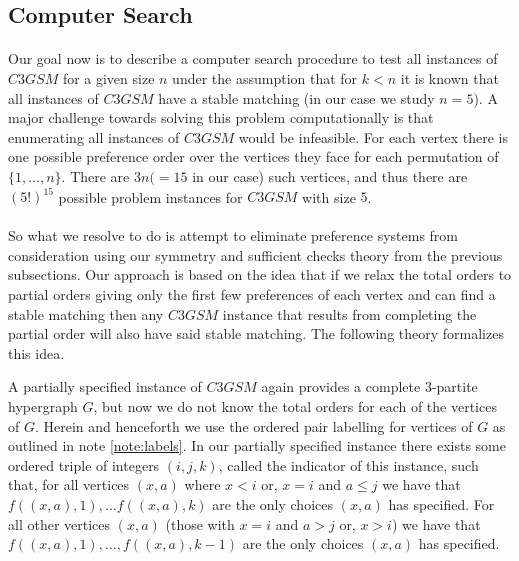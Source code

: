 \subsection{Computer Search}\label{sec:computersearch}
\paragraph{}
Our goal now is to describe a computer search procedure to test all instances of $C3GSM$ for a given size $n$ under the assumption that for $k<n$ it is known that all instances of $C3GSM$ have a stable matching (in our case we study $n=5$). A major challenge towards solving this problem computationally is that enumerating all instances of $C3GSM$ would be infeasible. For each vertex there is one possible preference order over the vertices they face for each permutation of $\{1,\dots,n\}$. There are $3n (=15$ in our case) such vertices, and thus there are $(5!)^{15}$ possible problem instances for $C3GSM$ with size $5$. 
\paragraph{}
So what we resolve to do is attempt to eliminate preference systems from consideration using our symmetry and sufficient checks theory from the previous subsections. Our approach is based on the idea that if we relax the total orders to partial orders giving only the first few preferences of each vertex and can find a stable matching then any $C3GSM$ instance that results from completing the partial order will also have said stable matching. The following theory formalizes this idea.
\begin{definition}
A partially specified instance of $C3GSM$ again provides a complete $3$-partite hypergraph $G$, but now we do not know the total orders for each of the vertices of $G$. Herein and henceforth we use the ordered pair labelling for vertices of $G$ as outlined in note \ref{note:labels}. In our partially specified instance there exists some ordered triple of integers $(i,j,k)$, called the indicator of this instance, such that, for all vertices $(x,a)$ where $x<i$ or, $x=i$ and $a\leq j$ we have that $f((x,a), 1), \dots f((x,a), k)$ are the only choices $(x,a)$ has specified. For all other vertices $(x,a)$ (those with $x=i$ and $a > j$ or, $x>i$) we have that $f((x,a), 1), \dots, f((x,a),k-1)$ are the only choices $(x,a)$ has specified.
\end{definition}

